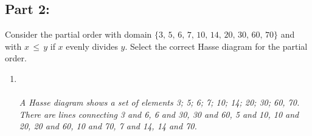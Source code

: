 \documentclass{amsart}
\theoremstyle{definition}
\theoremstyle{Exercise}
\theoremstyle{remark}
\theoremstyle{rule}
\numberwithin{equation}{section}
\begin{document}
	\subsection*{Part 2:}
	Consider the partial order with domain $\{3,\, 5,\, 6, \,7,\, 10,\, 14,\, 20,\,
	30,\, 60,\, 70\}$ and with $x\,\leq \,y$ if $x$ evenly divides $y$. Select the
	correct Hasse diagram for the partial order.

	\begin{enumerate}[label=(\alph{*})]
		\item {} \\\\
			{\color{blue}{\bf Figure 2:} \emph{A Hasse diagram shows a set of elements {3; 5; 6; 7; 10; 14; 20; 30; 60, 70}. There are lines connecting 3 and 6, 6 and 30, 30 and 60, 5 and 10, 10 and 20, 20 and 60, 10 and 70, 7 and 14, 14 and 70. } }
			\\ \\
			\\\\
			\newpage
			~\\~\\


\end{enumerate}
\end{document}
